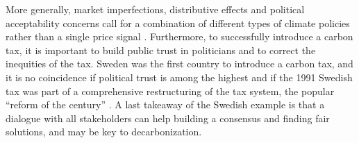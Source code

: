 \documentclass[english,5p,authoryear]{elsarticle}
\begin{document}
More generally, market imperfections, distributive effects and political acceptability concerns call for a combination of different types of climate policies rather than a single price signal \citep{stern_report_2017,stiglitz_addressing_2019}. Furthermore, to successfully introduce a carbon tax, it is important to build public trust in politicians \citep{harring_jagers_2013} and to correct the inequities of the tax. Sweden was the first country to introduce a carbon tax, and it is no coincidence if political trust is among the highest \citep{klenert_making_2018} and if the 1991 Swedish tax was part of a comprehensive restructuring of the tax system, the popular ``reform of the century'' \citep{sterner_environmental_2014}. A last takeaway of the Swedish example is that a dialogue with all stakeholders can help building a consensus and finding fair solutions, and may be key to decarbonization.


\end{document}
